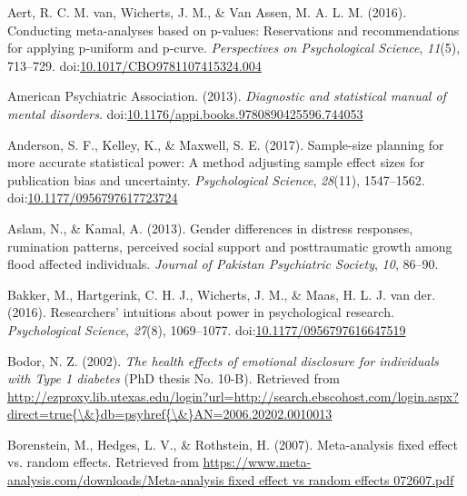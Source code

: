 \documentclass[english,man, mask]{apa6}
\theoremstyle{definition}
\theoremstyle{definition}
\theoremstyle{definition}
\theoremstyle{remark}
\begin{document}
\setlength{\parindent}{-0.5in} \setlength{\leftskip}{0.5in}

\hypertarget{refs}{}
\hypertarget{ref-VanAert2016}{}
Aert, R. C. M. van, Wicherts, J. M., \& Van Assen, M. A. L. M. (2016).
Conducting meta-analyses based on p-values: Reservations and
recommendations for applying p-uniform and p-curve. \emph{Perspectives
on Psychological Science}, \emph{11}(5), 713--729.
doi:\href{https://doi.org/10.1017/CBO9781107415324.004}{10.1017/CBO9781107415324.004}

\hypertarget{ref-AmericanPsychiatricAssociation2013}{}
American Psychiatric Association. (2013). \emph{Diagnostic and
statistical manual of mental disorders}.
doi:\href{https://doi.org/10.1176/appi.books.9780890425596.744053}{10.1176/appi.books.9780890425596.744053}

\hypertarget{ref-Anderson2017a}{}
Anderson, S. F., Kelley, K., \& Maxwell, S. E. (2017). Sample-size
planning for more accurate statistical power: A method adjusting sample
effect sizes for publication bias and uncertainty. \emph{Psychological
Science}, \emph{28}(11), 1547--1562.
doi:\href{https://doi.org/10.1177/0956797617723724}{10.1177/0956797617723724}

\hypertarget{ref-Aslam2013}{}
Aslam, N., \& Kamal, A. (2013). Gender differences in distress
responses, rumination patterns, perceived social support and
posttraumatic growth among flood affected individuals. \emph{Journal of
Pakistan Psychiatric Society}, \emph{10}, 86--90.

\hypertarget{ref-Bakker2016}{}
Bakker, M., Hartgerink, C. H. J., Wicherts, J. M., \& Maas, H. L. J. van
der. (2016). Researchers' intuitions about power in psychological
research. \emph{Psychological Science}, \emph{27}(8), 1069--1077.
doi:\href{https://doi.org/10.1177/0956797616647519}{10.1177/0956797616647519}

\hypertarget{ref-Bodor2002}{}
Bodor, N. Z. (2002). \emph{The health effects of emotional disclosure
for individuals with Type 1 diabetes} (PhD thesis No. 10-B). Retrieved
from
\href{http://ezproxy.lib.utexas.edu/login?url=http://search.ebscohost.com/login.aspx?direct=true\%7B/\&\%7Ddb=psyhref\%7B/\&\%7DAN=2006.20202.0010013}{http://ezproxy.lib.utexas.edu/login?url=http://search.ebscohost.com/login.aspx?direct=true\{\textbackslash{}\&\}db=psyhref\{\textbackslash{}\&\}AN=2006.20202.0010013}

\hypertarget{ref-Borenstein2007}{}
Borenstein, M., Hedges, L. V., \& Rothstein, H. (2007). Meta-analysis
fixed effect vs. random effects. Retrieved from
\href{https://www.meta-analysis.com/downloads/Meta-analysis\%20fixed\%20effect\%20vs\%20random\%20effects\%20072607.pdf}{https://www.meta-analysis.com/downloads/Meta-analysis fixed effect vs random effects 072607.pdf}
\end{document}
